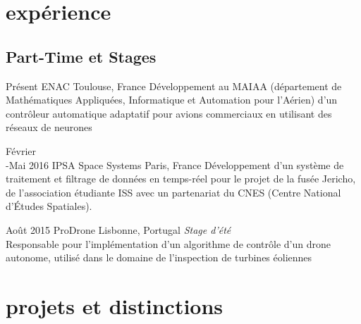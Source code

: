 \documentclass[]{friggeri-cv} %
\begin{document}

\section{expérience}


\subsection{Part-Time et Stages}

\begin{entrylist}
\entry
{Présent}
{ENAC}
{Toulouse, France}
{Développement au MAIAA (département de Mathématiques Appliquées, Informatique et Automation pour l'Aérien) d'un contrôleur automatique adaptatif pour avions commerciaux en utilisant des réseaux de neurones}



\entry
{Février\\-Mai 2016}
{IPSA Space Systems}
{Paris, France}
{Développement d'un système de traitement et filtrage de données en temps-réel pour le projet de la fusée Jericho, de l'association étudiante ISS avec un partenariat du CNES (Centre National d'Études Spatiales).}


\entry
{Août 2015}
{ProDrone}
{Lisbonne, Portugal}
{\emph{Stage d'été} \\
Responsable pour l'implémentation d'un algorithme de contrôle d'un drone autonome, utilisé dans le domaine de l'inspection de turbines éoliennes}



\end{entrylist}


\section{projets et distinctions}
\end{document}

